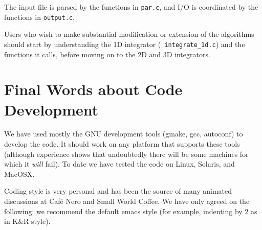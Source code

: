 The input file is parsed by the functions in {\tt par.c}, and I/O
is coordinated by the functions in {\tt output.c}.

Users who wish to make substantial modification or extension of
the algorithms should start by understanding the 1D integrator ({\tt
integrate\_1d.c}) and the functions it calls, before moving on to the 2D
and 3D integrators.

\section{Final Words about Code Development}

We have used mostly the GNU development tools (gmake, gcc, autoconf)
to develop the code.  It should work on any platform that supports
these tools (although experience shows that undoubtedly there will be some
machines for which it {\em will} fail).   To date we have tested the
code on Linux, Solaris, and MacOSX.

Coding style is very personal and has been the source of many animated
discussions at Caf\'{e} Nero and Small World Coffee.  We have only agreed
on the following: we recommend the default emacs style (for example,
indenting by 2 as in K\&R style).



